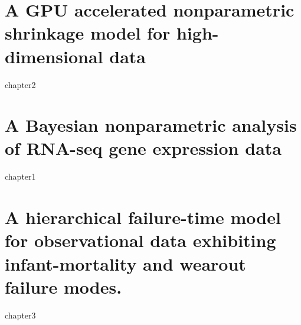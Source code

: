 \documentclass[11pt]{isuthesis}
\begin{document}


\tableofcontents
{} \cleardoublepage {}
{}
\listoftables
\cleardoublepage {} {}
\listoffigures

\newtoggle{thesis}
\toggletrue{thesis}

\cleardoublepage {}  %
\cleardoublepage {}         %



\newpage
{}



\chapter{A GPU accelerated nonparametric shrinkage
model for high-dimensional data}
{chapter2}

\chapter{A Bayesian nonparametric analysis of
RNA-seq gene expression data}
{chapter1}

\chapter{A hierarchical failure-time model for observational data exhibiting infant-mortality and wearout failure modes.}
{chapter3}



\appendixtitle
\appendix





\renewcommand{\bibname}{\centerline{BIBLIOGRAPHY}}
\unappendixtitle
\newpage
{}
{}

\end{document}
